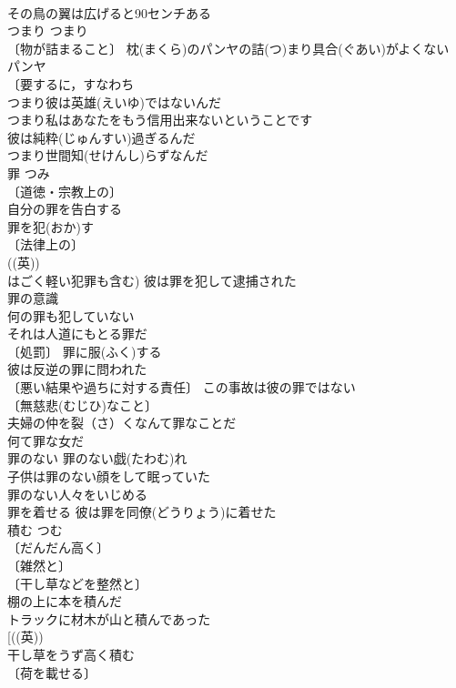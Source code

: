 \documentclass[8pt]{extreport}
\begin{document}
\begin{CJK}{UTF8}{min}
\\	その鳥の翼は広げると90センチある 
\\	つまり	つまり	
\\	〔物が詰まること〕 枕(まくら)のパンヤの詰(つ)まり具合(ぐあい)がよくない 
\\	パンヤ　
\\	〔要するに，すなわち 
\\	つまり彼は英雄(えいゆ)ではないんだ 
\\	つまり私はあなたをもう信用出来ないということです 
\\	彼は純粋(じゅんすい)過ぎるんだ
\\	つまり世間知(せけんし)らずなんだ 
\\	罪	つみ	
\\	〔道徳・宗教上の〕
\\	自分の罪を告白する 
\\	罪を犯(おか)す 
\\	〔法律上の〕
\\	((英)) 
\\	はごく軽い犯罪も含む) 彼は罪を犯して逮捕された 
\\	罪の意識 
\\	何の罪も犯していない 
\\	それは人道にもとる罪だ 
\\	〔処罰〕 罪に服(ふく)する 
\\	彼は反逆の罪に問われた 
\\	〔悪い結果や過ちに対する責任〕 この事故は彼の罪ではない 
\\	〔無慈悲(むじひ)なこと〕
\\	夫婦の仲を裂（さ）くなんて罪なことだ 
\\	何て罪な女だ 
\\	罪のない 罪のない戯(たわむ)れ 
\\	子供は罪のない顔をして眠っていた 
\\	罪のない人々をいじめる 
\\	罪を着せる 彼は罪を同僚(どうりょう)に着せた 
\\	積む	つむ	
\\	〔だんだん高く〕
\\	〔雑然と〕
\\	〔干し草などを整然と〕
\\	棚の上に本を積んだ 
\\	トラックに材木が山と積んであった 
\\	[((英)) 
\\	干し草をうず高く積む 
\\	〔荷を載せる〕

\end{CJK}
\end{document}

